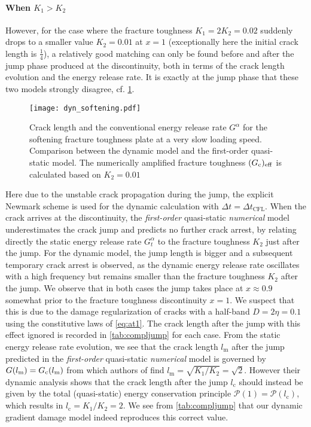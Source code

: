 \paragraph{When $K_1>K_2$} However, for the case where the fracture toughness $K_1=2K_2=0.02$ suddenly drops to a smaller value $K_2=0.01$ at $x=1$ (exceptionally here the initial crack length is $\frac{1}{4}$), a relatively good matching can only be found before and after the jump phase produced at the discontinuity, both in terms of the crack length evolution and the energy release rate. It is exactly at the jump phase that these two models strongly disagree, cf. \cref{eq:ressoftening}.
\begin{figure}[htbp]
\centering
\texttt{[image: dyn\_softening.pdf]}
\caption{Crack length and the conventional energy release rate $G^\alpha$ for the softening fracture toughness plate at a very slow loading speed. Comparison between the dynamic model and the first-order quasi-static model. The numerically amplified fracture toughness $(G_\mathrm{c})_\mathrm{eff}$ is calculated based on $K_2=0.01$} \label{eq:ressoftening}
\end{figure}
Here due to the unstable crack propagation during the jump, the explicit Newmark scheme is used for the dynamic calculation with $\Delta t=\Delta t_\mathrm{CFL}$. When the crack arrives at the discontinuity, the \emph{first-order} quasi-static \emph{numerical} model underestimates the crack jump and predicts no further crack arrest, by relating directly the static energy release rate $G^\alpha_t$ to the fracture toughness $K_2$ just after the jump. For the dynamic model, the jump length is bigger and a subsequent temporary crack arrest is observed, as the dynamic energy release rate oscillates with a high frequency but remains smaller than the fracture toughness $K_2$ after the jump. We observe that in both cases the jump takes place at $x\approx 0.9$ somewhat prior to the fracture toughness discontinuity $x=1$. We suspect that this is due to the damage regularization of cracks with a half-band $D=2\eta=0.1$ using the constitutive laws of \eqref{eq:at1}. The crack length after the jump with this effect ignored is recorded in \cref{tab:compljump} for each case. From the static energy release rate evolution, we see that the crack length $l_\mathrm{m}$ after the jump predicted in the \emph{first-order} quasi-static \emph{numerical} model is governed by $G(l_\mathrm{m})=G_\mathrm{c}(l_\mathrm{m})$ from which authors of \cite{DumouchelMarigoCharlotte:2008} find $l_\mathrm{m}=\sqrt{K_1/K_2}=\sqrt{2}$. However their dynamic analysis shows that the crack length after the jump $l_\mathrm{c}$ should instead be given by the total (quasi-static) energy conservation principle $\mathcal{P}(1)=\mathcal{P}(l_\mathrm{c})$, which results in $l_\mathrm{c}=K_1/K_2=2$. We see from \cref{tab:compljump} that our dynamic gradient damage model indeed reproduces this correct value.
